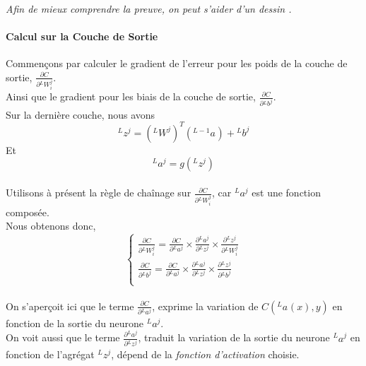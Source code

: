\documentclass[10pt,a4paper]{report}
\newcommand{\lexp}[1]{\phantom{}^{#1}}
\newcommand{\elem}[4]{\lexp{#2}#1^{#3}_{#4}}
\begin{document}
				 \emph{\\Afin de mieux comprendre la preuve, on peut s'aider d'un dessin \smiley{}.}
				
				\paragraph{Calcul sur la Couche de Sortie}
				
				Commençons par calculer le gradient de l'erreur pour les poids de la couche de sortie, $\frac{\partial C}{\partial \elem{W}{L}{j}{i}}$.\\
				Ainsi que le gradient pour les biais de la couche de sortie, $\frac{\partial C}{\partial \elem{b}{L}{j}{}}$.\\
				Sur la dernière couche, nous avons
				$$\elem{z}{L}{j}{} = (\elem{W}{L}{j}{})^T(\elem{a}{L-1}{}{}) + \elem{b}{L}{j}{}$$
				Et
				$$\elem{a}{L}{j}{} = g(\elem{z}{L}{j}{})$$\\
				Utilisons à présent la règle de chaînage sur $\frac{\partial C}{\partial \elem{W}{L}{j}{i}}$, car $\elem{a}{L}{j}{}$ est une fonction composée.\\
				Nous obtenons donc,
				$$\left\{
				\begin{array}{l}
					\frac{\partial C}{\partial \elem{W}{L}{j}{i}} = \frac{\partial C}{\partial \elem{a}{L}{j}{}} \times \frac{\partial \elem{a}{L}{j}{}}{\partial \elem{z}{L}{j}{}} \times \frac{\partial \elem{z}{L}{j}{}}{\partial \elem{W}{L}{j}{i}}\\
					
					\frac{\partial C}{\partial \elem{b}{L}{j}{}} = \frac{\partial C}{\partial \elem{a}{L}{j}{}} \times \frac{\partial \elem{a}{L}{j}{}}{\partial \elem{z}{L}{j}{}} \times \frac{\partial \elem{z}{L}{j}{}}{\partial \elem{b}{L}{j}{}}\\
				\end{array}
				\right.$$\\
				
				On s'aperçoit ici que le terme $\frac{\partial C}{\partial \elem{a}{L}{j}{}}$, exprime la variation de $C(\elem{a}{L}{}{}(x),y)$ en fonction de la sortie du neurone $\elem{a}{L}{j}{}$.\\
				
				On voit aussi que le terme $\frac{\partial \elem{a}{L}{j}{}}{\partial \elem{z}{L}{j}{}}$, traduit la variation de la sortie du neurone $\elem{a}{L}{j}{}$ en fonction de l'agrégat $\elem{z}{L}{j}{}$, dépend de la \emph{fonction d'activation} choisie.\\
				
\end{document}
